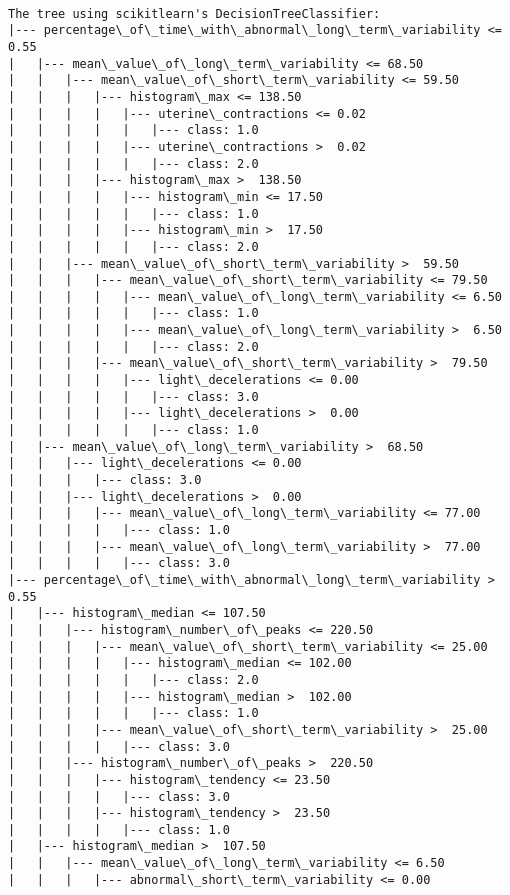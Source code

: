 \documentclass[11pt]{article}
\begin{document}
    \begin{Verbatim}[commandchars=\\\{\}]

The tree using scikitlearn's DecisionTreeClassifier:
|--- percentage\_of\_time\_with\_abnormal\_long\_term\_variability <= 0.55
|   |--- mean\_value\_of\_long\_term\_variability <= 68.50
|   |   |--- mean\_value\_of\_short\_term\_variability <= 59.50
|   |   |   |--- histogram\_max <= 138.50
|   |   |   |   |--- uterine\_contractions <= 0.02
|   |   |   |   |   |--- class: 1.0
|   |   |   |   |--- uterine\_contractions >  0.02
|   |   |   |   |   |--- class: 2.0
|   |   |   |--- histogram\_max >  138.50
|   |   |   |   |--- histogram\_min <= 17.50
|   |   |   |   |   |--- class: 1.0
|   |   |   |   |--- histogram\_min >  17.50
|   |   |   |   |   |--- class: 2.0
|   |   |--- mean\_value\_of\_short\_term\_variability >  59.50
|   |   |   |--- mean\_value\_of\_short\_term\_variability <= 79.50
|   |   |   |   |--- mean\_value\_of\_long\_term\_variability <= 6.50
|   |   |   |   |   |--- class: 1.0
|   |   |   |   |--- mean\_value\_of\_long\_term\_variability >  6.50
|   |   |   |   |   |--- class: 2.0
|   |   |   |--- mean\_value\_of\_short\_term\_variability >  79.50
|   |   |   |   |--- light\_decelerations <= 0.00
|   |   |   |   |   |--- class: 3.0
|   |   |   |   |--- light\_decelerations >  0.00
|   |   |   |   |   |--- class: 1.0
|   |--- mean\_value\_of\_long\_term\_variability >  68.50
|   |   |--- light\_decelerations <= 0.00
|   |   |   |--- class: 3.0
|   |   |--- light\_decelerations >  0.00
|   |   |   |--- mean\_value\_of\_long\_term\_variability <= 77.00
|   |   |   |   |--- class: 1.0
|   |   |   |--- mean\_value\_of\_long\_term\_variability >  77.00
|   |   |   |   |--- class: 3.0
|--- percentage\_of\_time\_with\_abnormal\_long\_term\_variability >  0.55
|   |--- histogram\_median <= 107.50
|   |   |--- histogram\_number\_of\_peaks <= 220.50
|   |   |   |--- mean\_value\_of\_short\_term\_variability <= 25.00
|   |   |   |   |--- histogram\_median <= 102.00
|   |   |   |   |   |--- class: 2.0
|   |   |   |   |--- histogram\_median >  102.00
|   |   |   |   |   |--- class: 1.0
|   |   |   |--- mean\_value\_of\_short\_term\_variability >  25.00
|   |   |   |   |--- class: 3.0
|   |   |--- histogram\_number\_of\_peaks >  220.50
|   |   |   |--- histogram\_tendency <= 23.50
|   |   |   |   |--- class: 3.0
|   |   |   |--- histogram\_tendency >  23.50
|   |   |   |   |--- class: 1.0
|   |--- histogram\_median >  107.50
|   |   |--- mean\_value\_of\_long\_term\_variability <= 6.50
|   |   |   |--- abnormal\_short\_term\_variability <= 0.00

\end{Verbatim}
\end{document}
